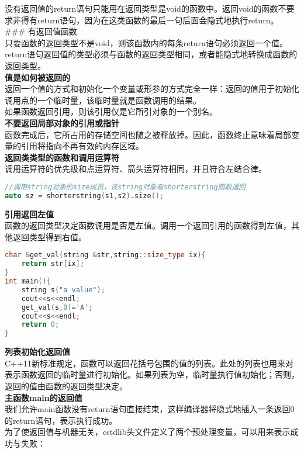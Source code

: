 \documentclass[
  a4paper,
  oneside,tablecaptionabove
]{scrbook}
\begin{document}
没有返回值的return语句只能用在返回类型是void的函数中。返回void的函数不要求非得有return语句，因为在这类函数的最后一句后面会隐式地执行return。\\
\#\#\# 有返回值函数\\
只要函数的返回类型不是void，则该函数内的每条return语句必须返回一个值。return语句返回值的类型必须与函数的返回类型相同，或者能隐式地转换成函数的返回类型。\\
\textbf{值是如何被返回的}\\
返回一个值的方式和初始化一个变量或形参的方式完全一样：返回的值用于初始化调用点的一个临时量，该临时量就是函数调用的结果。\\
如果函数返回引用，则该引用仅是它所引对象的一个别名。\\
\textbf{不要返回局部对象的引用或指针}\\
函数完成后，它所占用的存储空间也随之被释放掉。因此，函数终止意味着局部变量的引用将指向不再有效的内存区域。\\
\textbf{返回类类型的函数和调用运算符}\\
调用运算符的优先级和点运算符、箭头运算符相同，并且符合左结合律。

\begin{lstlisting}[language={C++}]
//调用string对象的size成员，该string对象有shorterstring函数返回
auto sz = shorterstring(s1,s2).size();
\end{lstlisting}

\textbf{引用返回左值}\\
函数的返回类型决定函数调用是否是左值。调用一个返回引用的函数得到左值，其他返回类型得到右值。

\begin{lstlisting}[language={C++}]
char &get_val(string &str,string::size_type ix){
    return str[ix];
}
int main(){
    string s("a value");
    cout<<s<<endl;
    get_val(s,0)='A';
    cout<<s<<endl;
    return 0;   
}
\end{lstlisting}

\textbf{列表初始化返回值}\\
C++11新标准规定，函数可以返回花括号包围的值的列表。此处的列表也用来对表示函数返回的临时量进行初始化。如果列表为空，临时量执行值初始化；否则，返回的值由函数的返回类型决定。\\
\textbf{主函数main的返回值}\\
我们允许main函数没有return语句直接结束，这样编译器将隐式地插入一条返回0的return语句，表示执行成功。\\
为了使返回值与机器无关，cstdlib头文件定义了两个预处理变量，可以用来表示成功与失败：
\end{document}
